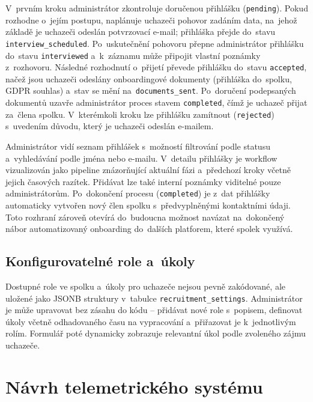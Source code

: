 \begin{sloppypar}
V~prvním kroku administrátor zkontroluje doručenou přihlášku (\texttt{pending}). Pokud rozhodne o~jejím postupu, naplánuje uchazeči pohovor zadáním data, na~jehož základě je uchazeči odeslán potvrzovací e-mail; přihláška přejde do~stavu \texttt{interview\-\_scheduled}. Po~uskutečnění pohovoru přepne administrátor přihlášku do~stavu \texttt{inter\-viewed} a~k~záznamu může připojit vlastní poznámky z~rozhovoru. Následné rozhodnutí o~přijetí převede přihlášku do~stavu \texttt{accepted}, načež jsou uchazeči odeslány onboardingové dokumenty (přihláška do~spolku, GDPR souhlas) a~stav se mění na~\texttt{documents\-\_sent}. Po~doručení podepsaných dokumentů uzavře administrátor proces stavem \texttt{completed}, čímž je uchazeč přijat za~člena spolku. V~kterémkoli kroku lze přihlášku zamítnout (\texttt{rejected}) s~uvedením důvodu, který je uchazeči odeslán e-mailem.
\end{sloppypar}

Administrátor vidí seznam přihlášek s~možností filtrování podle statusu a~vyhledávání podle jména nebo e-mailu. V~detailu přihlášky je workflow vizualizován jako pipeline znázorňující aktuální fázi a~předchozí kroky včetně jejich časových razítek. Přidávat lze také interní poznámky viditelné pouze administrátorům. Po~dokončení procesu (\texttt{completed}) je z~dat přihlášky automaticky vytvořen nový člen spolku s~předvyplněnými kontaktními údaji. Toto rozhraní zároveň otevírá do~budoucna možnost navázat na~dokončený nábor automatizovaný onboarding do~dalších platforem, které spolek využívá. 

\subsection{Konfigurovatelné role a~úkoly}

Dostupné role ve spolku a~úkoly pro uchazeče nejsou pevně zakódované, ale uložené jako JSONB struktury v~tabulce \texttt{recruitment\_settings}. Administrátor je může upravovat bez zásahu do kódu -- přidávat nové role s~popisem, definovat úkoly včetně odhadovaného času na vypracování a~přiřazovat je k~jednotlivým rolím. Formulář poté dynamicky zobrazuje relevantní úkol podle zvoleného zájmu uchazeče.

\section{Návrh telemetrického systému}
\label{sec:navrh-telemetrie}

